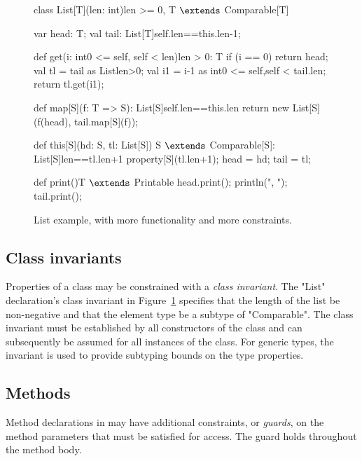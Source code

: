 \begin{figure}
{\footnotesize
\begin{xtenmathnoindent}
class List[T](len: int){len >= 0, T $\extends$ Comparable[T]} {
  var head: T;
  val tail: List[T]{self.len==this.len-1};

  def get(i: int{0 <= self, self < len}){len > 0}: T {
    if (i == 0)
      return head;
    val tl = tail as List{len>0};
    val i1 = i-1 as int{0 <= self,self < tail.len};
    return tl.get(i1);
  }

  def map[S](f: T => S): List[S]{self.len==this.len} {
    return new List[S](f(head), tail.map[S](f));
  }

  def this[S](hd: S, tl: List[S])
      {S $\extends$ Comparable[S]}: List[S]{len==tl.len+1} {
    property[S](tl.len+1);
    head = hd; tail = tl;
  }

  def print(){T $\extends$ Printable} {
    head.print();
    println(", ");
    tail.print();
  }
}
\end{xtenmathnoindent}}
\caption{List example, with more functionality and more
constraints.}
\label{fig:list}
\end{figure}

\subsection{Class invariants}

Properties of a class may be constrained with 
a \emph{class invariant}.
The \xcd"List" declaration's class invariant in
Figure~\ref{fig:list} specifies that the length of
the list be non-negative and that the element type be
a subtype of \xcd"Comparable".
The class invariant must be established by all constructors of
the class and can subsequently be assumed for all instances of the class.
For generic types, the invariant is used to provide subtyping
bounds on the type properties.

\subsection{Methods}

Method declarations in \Xten
may have additional
constraints, or \emph{guards}, on the method parameters
that must be satisfied for access.
The guard holds throughout the method body.


